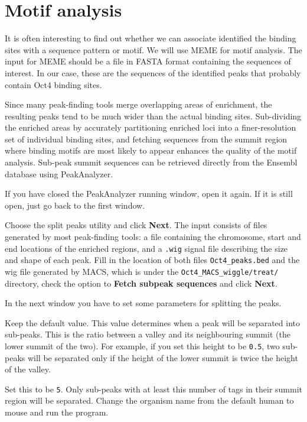 \section{Motif analysis}

\begin{information}
It is often interesting to find out whether we can associate identified the
binding sites with a sequence pattern or motif. We will use MEME for motif
analysis. The input for MEME should be a file in FASTA format containing the
sequences of interest. In our case, these are the sequences of the identified
peaks that probably contain Oct4 binding sites.

Since many peak-finding tools merge overlapping areas of enrichment, the
resulting peaks tend to be much wider than the actual binding sites.
Sub-dividing the enriched areas by accurately partitioning enriched loci into a
finer-resolution set of individual binding sites, and fetching sequences from
the summit region where binding motifs are most likely to appear enhances the
quality of the motif analysis. Sub-peak summit sequences can be retrieved
directly from the Ensembl database using PeakAnalyzer.
\end{information}

\begin{steps}
If you have closed the PeakAnalyzer running window, open it again. If it is
still open, just go back to the first window.

Choose the split peaks utility and click \textbf{Next}. The input consists of
files generated by most peak-finding tools: a file containing the chromosome,
start and end locations of the enriched regions, and a \texttt{.wig} signal file
describing the size and shape of each peak. Fill in the location of both files
\texttt{Oct4\_peaks.bed} and the wig file generated by MACS, which is under the
\texttt{Oct4\_MACS\_wiggle/treat/} directory, check the option to \textbf{Fetch subpeak
sequences} and click \textbf{Next}.

In the next window you have to set some parameters for splitting the peaks.

\begin{description}[style=multiline,labelindent=0cm,align=right,leftmargin=\descriptionlabelspace,rightmargin=1.5cm,font=\ttfamily]
 \item[Separation float] Keep the default value. This value determines when a
 peak will be separated into sub-peaks. This is the ratio between a valley and
 its neighbouring summit (the lower summit of the two). For example, if you set
 this height to be \texttt{0.5}, two sub-peaks will be separated only if the
 height of the lower summit is twice the height of the valley.
 \item[Minimum height] Set this to be \texttt{5}. Only sub-peaks with at least this
 number of tags in their summit region will be separated. Change the organism
 name from the default human to mouse and run the program.
\end{description}
\end{steps}


